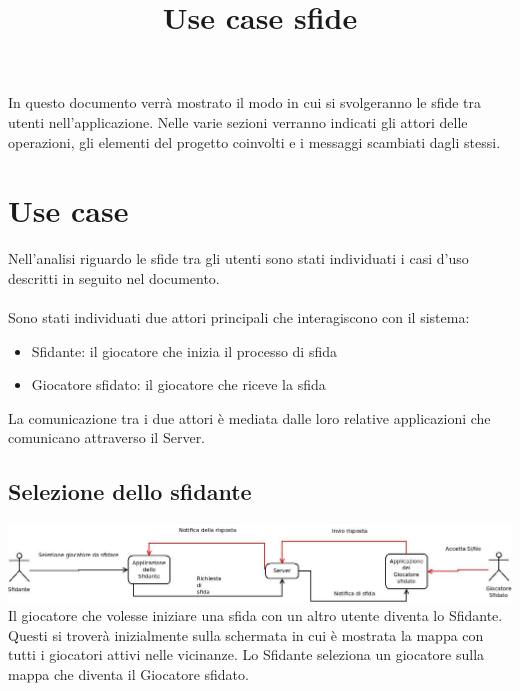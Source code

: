 \documentclass[12pt,a4]{article}
\title{Use case sfide}
\begin{document}
\maketitle
In questo documento verrà mostrato il modo in cui si svolgeranno le sfide tra utenti nell'applicazione. Nelle varie sezioni verranno indicati gli attori delle operazioni, gli elementi del progetto coinvolti e i messaggi scambiati dagli stessi.

\section*{Use case}
Nell'analisi riguardo le sfide tra gli utenti sono stati individuati i casi d'uso descritti in seguito nel documento.\\
\\Sono stati individuati due attori principali che interagiscono con il sistema:
\begin{itemize}
\item Sfidante: il giocatore che inizia il processo di sfida
\item Giocatore sfidato: il giocatore che riceve la sfida
\end{itemize}
La comunicazione tra i due attori è mediata dalle loro relative applicazioni che comunicano attraverso il Server. 
\subsection*{Selezione dello sfidante}
\includegraphics[scale=0.3]{./UseCaseSfide.jpeg}\\
Il giocatore che volesse iniziare una sfida con un altro utente diventa lo Sfidante. Questi si troverà inizialmente sulla schermata in cui è mostrata la mappa con tutti i giocatori attivi nelle vicinanze. Lo Sfidante seleziona un giocatore sulla mappa che diventa il Giocatore sfidato.\\
\end{document}
